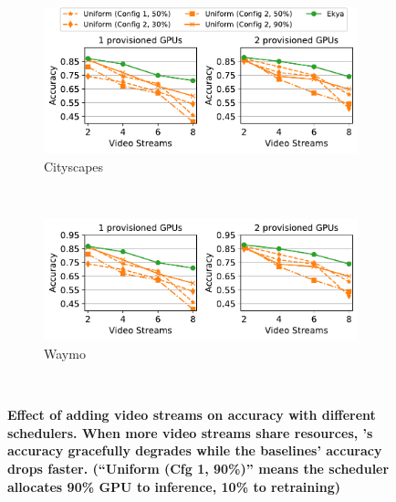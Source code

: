 \begin{figure}[t]
\captionsetup[subfigure]{justification=centering}
  \centering
  \begin{subfigure}[t]{0.9\linewidth}
    \centering
    \includegraphics[width=\linewidth]{ekya/results/sys_impl/sysimpl_varyingcities_streams_cityscapes.pdf}
    \caption{\small Cityscapes}
    \label{fig:sys-impl-cityscapes}
  \end{subfigure}
  \\
  \begin{subfigure}[t]{0.9\linewidth}
    \centering
    \includegraphics[width=\linewidth]{ekya/results/sys_impl/sysimpl_varyingcities_streams_waymo.pdf}
    \caption{\small Waymo}
    \label{fig:sys-impl-waymo}
  \end{subfigure}
  ~~~
  \caption{\small \bf  Effect of adding video streams on accuracy with different schedulers. When more video streams share resources, \name's accuracy gracefully degrades while the baselines' accuracy drops faster. (``Uniform (Cfg 1, 90\%)'' means the \fair scheduler allocates 90\% GPU to inference, 10\% to retraining)
  }
  \label{fig:scalability-sysimpl-fixedGPUs-accuracy}
\end{figure}

